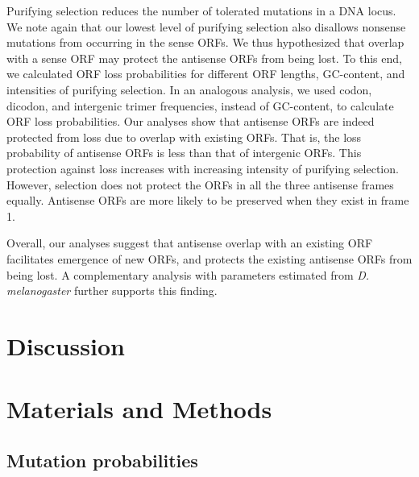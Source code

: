 \documentclass[12pt,a4paper]{article}
\begin{document}
Purifying selection reduces the number of tolerated mutations in a DNA locus. We note again that our lowest level of purifying selection also disallows nonsense mutations from occurring in the sense ORFs. We thus hypothesized that overlap with a sense ORF may protect the antisense ORFs from being lost. To this end, we calculated ORF loss probabilities for different ORF lengths, GC-content, and intensities of purifying selection. In an analogous analysis, we used codon, dicodon, and intergenic trimer frequencies, instead of GC-content, to calculate ORF loss probabilities. Our analyses show that antisense ORFs are indeed protected from loss due to overlap with existing ORFs. That is, the loss probability of antisense ORFs is less than that of intergenic ORFs. This protection against loss increases with increasing intensity of purifying selection. However, selection does not protect the ORFs in all the three antisense frames equally. Antisense ORFs are more likely to be preserved when they exist in frame 1. 


Overall, our analyses suggest that antisense overlap with an existing ORF facilitates emergence of new ORFs, and protects the existing antisense ORFs from being lost. A complementary analysis with parameters estimated from \textit{D. melanogaster} further supports this finding.


%
%
% 




\section*{Discussion} 


\section*{Materials and Methods}

\subsection{Mutation probabilities}
\end{document}
